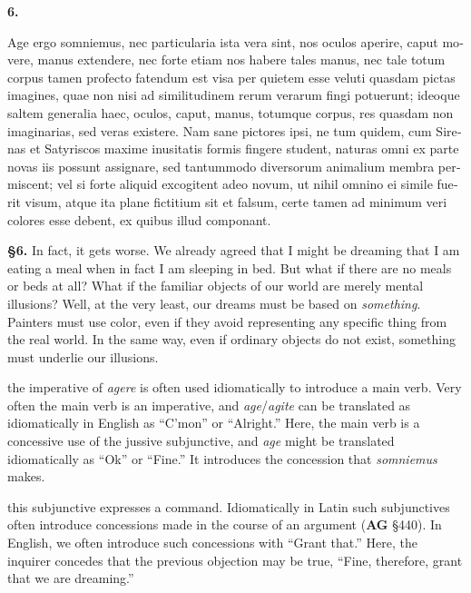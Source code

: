 \clearpage

\beginnumbering
\pstart
\textbf{6.} \begin{latin}Age ergo somniemus, nec particularia ista vera sint, nos oculos aperire, caput movere, manus extendere, nec forte etiam nos habere tales manus, nec tale totum corpus tamen profecto fatendum est visa per quietem esse veluti quasdam pictas imagines, quae non nisi ad similitudinem rerum verarum fingi potuerunt; ideoque saltem generalia haec, oculos, caput, manus, totumque corpus, res quasdam non imaginarias, sed veras existere. Nam sane pictores ipsi, ne tum quidem, cum Sirenas et Satyriscos maxime inusitatis formis fingere student, naturas omni ex parte novas iis possunt assignare, sed tantummodo diversorum animalium membra permiscent; vel si forte aliquid excogitent adeo novum, ut nihil omnino ei simile fuerit visum, atque ita plane fictitium sit et falsum, certe tamen ad minimum veri colores esse debent, ex quibus illud componant.\end{latin}
\pend
\endnumbering

\prenotes

\textbf{§6.} In fact, it gets worse. We already agreed that I might be dreaming that I am eating a meal when in fact I am sleeping in bed. But what if there are no meals or beds at all? What if the familiar objects of our world are merely mental illusions? Well, at the very least, our dreams must be based on \textit{something}. Painters must use color, even if they avoid representing any specific thing from the real world. In the same way, even if ordinary objects do not exist, something must underlie our illusions.

 the imperative of \textit{agere} is often used idiomatically to introduce a main verb. Very often the main verb is an imperative, and \textit{age}/\textit{agite} can be translated as idiomatically in English as ``C'mon'' or   ``Alright.'' Here, the main verb is a concessive use of the jussive subjunctive, and \textit{age} might be translated idiomatically as ``Ok'' or ``Fine.'' It introduces the concession that \textit{somniemus} makes.

 this subjunctive expresses a command. Idiomatically in Latin such subjunctives often introduce concessions made in the course of an argument (\textbf{AG} §440). In English, we often introduce such concessions with ``Grant that.'' Here, the inquirer concedes that the previous objection may be true, ``Fine, therefore, grant that we are dreaming.''

